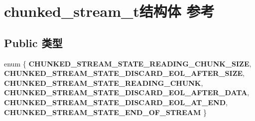 \hypertarget{structchunked__stream__t}{}\section{chunked\+\_\+stream\+\_\+t结构体 参考}
\label{structchunked__stream__t}
\subsection*{Public 类型}
\begin{DoxyCompactItemize}
\item 
\mbox{\label{structchunked__stream__t_a35d1e6e58ac349ec052a0c9289b0ea16}} 
enum \{ \newline
{\bfseries C\+H\+U\+N\+K\+E\+D\+\_\+\+S\+T\+R\+E\+A\+M\+\_\+\+S\+T\+A\+T\+E\+\_\+\+R\+E\+A\+D\+I\+N\+G\+\_\+\+C\+H\+U\+N\+K\+\_\+\+S\+I\+ZE}, 
{\bfseries C\+H\+U\+N\+K\+E\+D\+\_\+\+S\+T\+R\+E\+A\+M\+\_\+\+S\+T\+A\+T\+E\+\_\+\+D\+I\+S\+C\+A\+R\+D\+\_\+\+E\+O\+L\+\_\+\+A\+F\+T\+E\+R\+\_\+\+S\+I\+ZE}, 
{\bfseries C\+H\+U\+N\+K\+E\+D\+\_\+\+S\+T\+R\+E\+A\+M\+\_\+\+S\+T\+A\+T\+E\+\_\+\+R\+E\+A\+D\+I\+N\+G\+\_\+\+C\+H\+U\+NK}, 
{\bfseries C\+H\+U\+N\+K\+E\+D\+\_\+\+S\+T\+R\+E\+A\+M\+\_\+\+S\+T\+A\+T\+E\+\_\+\+D\+I\+S\+C\+A\+R\+D\+\_\+\+E\+O\+L\+\_\+\+A\+F\+T\+E\+R\+\_\+\+D\+A\+TA}, 
\newline
{\bfseries C\+H\+U\+N\+K\+E\+D\+\_\+\+S\+T\+R\+E\+A\+M\+\_\+\+S\+T\+A\+T\+E\+\_\+\+D\+I\+S\+C\+A\+R\+D\+\_\+\+E\+O\+L\+\_\+\+A\+T\+\_\+\+E\+ND}, 
{\bfseries C\+H\+U\+N\+K\+E\+D\+\_\+\+S\+T\+R\+E\+A\+M\+\_\+\+S\+T\+A\+T\+E\+\_\+\+E\+N\+D\+\_\+\+O\+F\+\_\+\+S\+T\+R\+E\+AM}
 \}
\end{DoxyCompactItemize}

